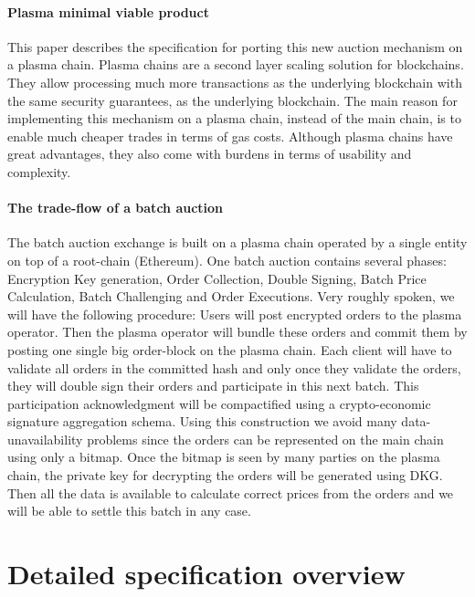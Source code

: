 \documentclass[11pt,parskip=full]{scrartcl}%
\begin{document}
\paragraph{Plasma minimal viable product}

This paper describes the specification for porting this new auction mechanism on a plasma chain. Plasma chains are a second layer scaling solution for blockchains. They allow processing much more transactions as the underlying blockchain with the same security guarantees, as the underlying blockchain. The main reason for implementing this mechanism on a plasma chain, instead of the main chain, is to enable much cheaper trades in terms of gas costs. Although plasma chains have great advantages, they also come with burdens in terms of usability and complexity.

\paragraph{The trade-flow of a batch auction}  

The batch auction exchange is built on a plasma chain operated by a single entity on top of a root-chain (Ethereum). One batch auction contains several phases: Encryption Key generation, Order Collection, Double Signing, Batch Price Calculation, Batch Challenging and Order Executions. Very roughly spoken, we will have the following procedure: Users will post encrypted orders to the plasma operator. Then the plasma operator will bundle these orders and commit them by posting one single big order-block on the plasma chain. Each client will have to validate all orders in the committed hash and only once they validate the orders, they will double sign their orders and participate in this next batch. This participation acknowledgment will be compactified using a crypto-economic signature aggregation schema. Using this construction we avoid many data-unavailability problems since the orders can be represented on the main chain using only a bitmap.
Once the bitmap is seen by many parties on the plasma chain, the private key for decrypting the orders will be generated using DKG. Then all the data is available to calculate correct prices from the orders and we will be able to settle this batch in any case. 



\clearpage
\section{Detailed specification overview}
\end{document}
